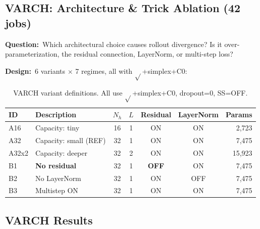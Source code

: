 \documentclass[11pt,letterpaper]{article}
\newcommand{\good}[1]{\textcolor{goodgreen}{\textbf{#1}}}
\begin{document}
\subsection{VARCH: Architecture \& Trick Ablation (42 jobs)}
\label{sec:varch}

\textbf{Question:}\ Which architectural choice causes rollout divergence?  Is it
over-parameterization, the residual connection, LayerNorm, or multi-step loss?

\textbf{Design:}\ 6 variants $\times$ 7 regimes, all with $\sqrt{}$+simplex+C0:

\begin{table}[H]
\centering
\caption{VARCH variant definitions. All use $\sqrt{}$+simplex+C0, dropout=0, SS=OFF.}
\label{tab:varch-design}
\small
\begin{tabular}{@{}llccccr@{}}
\toprule
ID & Description & $N_h$ & $L$ & Residual & LayerNorm & Params \\
\midrule
A16   & Capacity: tiny     & 16 & 1 & ON  & ON  & 2,723  \\
A32   & Capacity: small (REF) & 32 & 1 & ON  & ON  & 7,475  \\
A32x2 & Capacity: deeper   & 32 & 2 & ON  & ON  & 15,923 \\
\midrule
B1    & \textbf{No residual}    & 32 & 1 & \good{OFF} & ON  & 7,475  \\
B2    & No LayerNorm       & 32 & 1 & ON  & OFF & 7,475  \\
B3    & Multistep ON       & 32 & 1 & ON  & ON  & 7,475  \\
\bottomrule
\end{tabular}
\end{table}

\subsection{VARCH Results}
\label{sec:varch-results}
\end{document}
